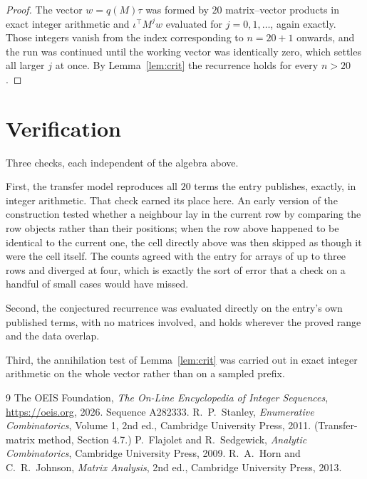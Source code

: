\documentclass[11pt,a4paper]{article}
\theoremstyle{plain}
\theoremstyle{definition}
\begin{document}
\begin{proof}
The vector $w=q(M)\tau$ was formed by $20$ matrix--vector products in exact integer
arithmetic and $\iota^{\!\top}M^{j}w$ evaluated for $j=0,1,\dots$, again exactly. Those
integers vanish from the index corresponding to $n=20+1$ onwards, and the run was
continued until the working vector was identically zero, which settles all larger $j$ at once.
By Lemma~\ref{lem:crit} the recurrence holds for every $n>20$.
\end{proof}

\section{Verification}

Three checks, each independent of the algebra above.

First, the transfer model reproduces all $20$ terms the entry publishes, exactly, in
integer arithmetic. That check earned its place here. An early version of the construction
tested whether a neighbour lay in the current row by comparing the row objects rather
than their positions; when the row above happened to be identical to the current one, the
cell directly above was then skipped as though it were the cell itself. The counts agreed with
the entry for arrays of up to three rows and diverged at four, which is exactly the sort of
error that a check on a handful of small cases would have missed.

Second, the conjectured recurrence was evaluated directly on the entry's own published terms,
with no matrices involved, and holds wherever the proved range and the data overlap.

Third, the annihilation test of Lemma~\ref{lem:crit} was carried out in exact integer
arithmetic on the whole vector rather than on a sampled prefix.

\begin{thebibliography}{9}
 The OEIS Foundation, \emph{The On-Line Encyclopedia of Integer
Sequences}, \url{https://oeis.org}, 2026. Sequence A282333.
 R.~P.~Stanley, \emph{Enumerative Combinatorics}, Volume 1, 2nd ed.,
Cambridge University Press, 2011. (Transfer-matrix method, Section 4.7.)
 P.~Flajolet and R.~Sedgewick, \emph{Analytic Combinatorics}, Cambridge
University Press, 2009.
 R.~A.~Horn and C.~R.~Johnson, \emph{Matrix Analysis}, 2nd ed., Cambridge
University Press, 2013.
\end{thebibliography}
\end{document}
